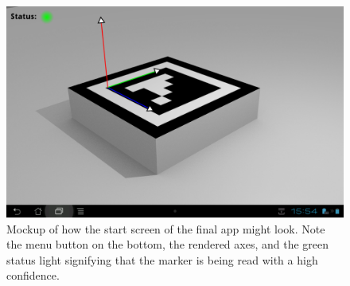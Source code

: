 \begin{figure}
	\centering
	\includegraphics[width=15cm]{images/start_mockup.png}
	\caption[Start screen mockup.]{Mockup of how the start screen of the final app might look. Note the menu button on the bottom, the rendered axes, and the green status light signifying that the marker is being read with a high confidence.}
	\label{fig:start_mockup}
\end{figure}
